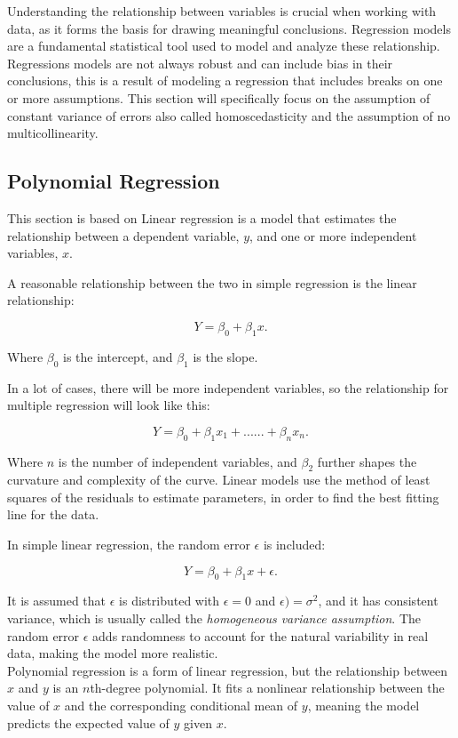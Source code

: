 Understanding the relationship between variables is crucial when working with data, as it forms the basis for drawing meaningful conclusions. Regression models are a fundamental statistical tool used to model and analyze these relationship. Regressions models are not always robust and can include bias in their conclusions, this is a result of modeling a regression that includes breaks on one or more assumptions. This section will specifically focus on the assumption of constant variance of errors also called homoscedasticity and the assumption of no multicollinearity.

\subsection*{Polynomial Regression}
This section is based on 
Linear regression is a model that estimates the relationship between a dependent variable, \( y \), and one or more independent variables, \( x \).

\noindent A reasonable relationship between the two in simple regression is the linear relationship:

\[
Y = \beta_0 + \beta_1 x .
\]

\noindent Where \( \beta_0 \) is the intercept, and \( \beta_1 \) is the slope.

\noindent In a lot of cases, there will be more independent variables, so the relationship for multiple regression will look like this:

\[
Y = \beta_0 + \beta_1 x_1 + ......+ \beta_n x_n .
\]



\noindent Where \( n \) is the number of independent variables, and $\beta_2$ further shapes the curvature and complexity of the curve. Linear models use the method of least squares of the residuals to estimate parameters, in order to find the best fitting line for the data.

\noindent In simple linear regression, the random error \( \epsilon \) is included:

\[
Y = \beta_0 + \beta_1 x + \epsilon .
\]

\noindent It is assumed that \( \epsilon \) is distributed with $\epsilon = 0$ and $\epsilon) = \sigma^2$, and it has consistent variance, which is usually called the \textit{homogeneous variance assumption}. The random error \( \epsilon \) adds randomness to account for the natural variability in real data, making the model more realistic.
\newline\\
Polynomial regression is a form of linear regression, but the relationship between \( x \) and \( y \) is an \( n \)th-degree polynomial. It fits a nonlinear relationship between the value of \( x \) and the corresponding conditional mean of \( y \), meaning the model predicts the expected value of \( y \) given \( x \). \newline


